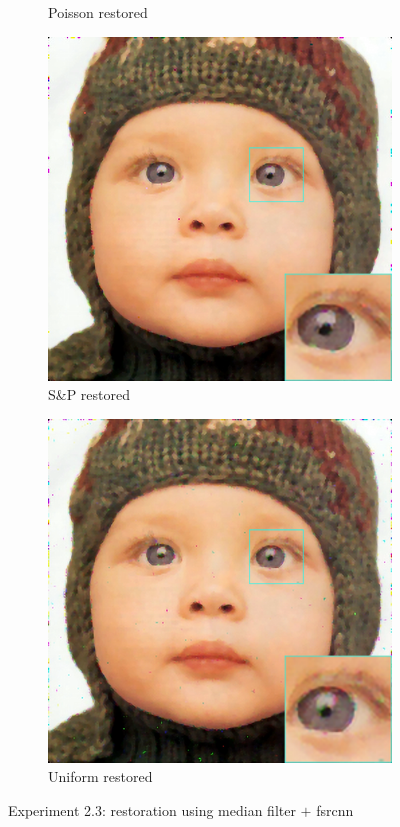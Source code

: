 \begin{figure}
\begin{subfigure}{0.24\textwidth}
		\caption{Poisson restored}
	\end{subfigure}
	\begin{subfigure}{0.24\textwidth}
		\includegraphics[width=\textwidth]{images/exp2.3/salt.png}
		\caption{S\&P restored}
	\end{subfigure}
	\begin{subfigure}{0.24\textwidth}
		\includegraphics[width=\textwidth]{images/exp2.3/uniform.png}
		\caption{Uniform restored}
	\end{subfigure}
	\caption{Experiment 2.3: restoration using median filter $+$ \gls{fsrcnn}}
	\label{fig:exp2.3}
\end{figure}

